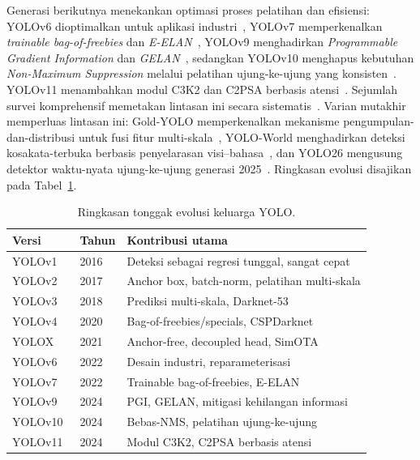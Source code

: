 \documentclass[11pt,a4paper]{article}
\begin{document}
Generasi berikutnya menekankan optimasi proses pelatihan dan efisiensi:
YOLOv6 dioptimalkan untuk aplikasi industri~\cite{li2022yolov6}, YOLOv7
memperkenalkan \emph{trainable bag-of-freebies} dan \emph{E-ELAN}~\cite{wang2023yolov7},
YOLOv9 menghadirkan \emph{Programmable Gradient Information} dan
\emph{GELAN}~\cite{wang2024yolov9}, sedangkan YOLOv10 menghapus kebutuhan
\emph{Non-Maximum Suppression} melalui pelatihan ujung-ke-ujung yang
konsisten~\cite{wang2024yolov10}. YOLOv11 menambahkan modul C3K2 dan C2PSA
berbasis atensi~\cite{khanam2024yolov11}. Sejumlah survei komprehensif memetakan
lintasan ini secara sistematis~\cite{terven2023yolo,hussain2023yolo,diwan2023yolo,
sapkota2024yoloagri,ali2024yoloreview,vijayakumar2024yolo,alif2024yoloevolution,
sohan2024yolov8review}. Varian mutakhir memperluas lintasan ini: Gold-YOLO
memperkenalkan mekanisme pengumpulan-dan-distribusi untuk fusi fitur
multi-skala~\cite{wang2023goldyolo}, YOLO-World menghadirkan deteksi
kosakata-terbuka berbasis penyelarasan visi--bahasa~\cite{cheng2024yoloworld},
dan YOLO26 mengusung detektor waktu-nyata ujung-ke-ujung generasi
2025~\cite{sapkota2025yolo26}. Ringkasan evolusi disajikan pada Tabel~\ref{tab:yolo}.

\begin{table}[htbp]
\centering
\caption{Ringkasan tonggak evolusi keluarga YOLO.}
\label{tab:yolo}
\small
\begin{tabular}{@{}llp{7.6cm}@{}}
\toprule
\textbf{Versi} & \textbf{Tahun} & \textbf{Kontribusi utama} \\
\midrule
YOLOv1~\cite{redmon2016yolo}      & 2016 & Deteksi sebagai regresi tunggal, sangat cepat \\
YOLOv2~\cite{redmon2017yolo9000}  & 2017 & Anchor box, batch-norm, pelatihan multi-skala \\
YOLOv3~\cite{redmon2018yolov3}    & 2018 & Prediksi multi-skala, Darknet-53 \\
YOLOv4~\cite{bochkovskiy2020yolov4} & 2020 & Bag-of-freebies/specials, CSPDarknet \\
YOLOX~\cite{ge2021yolox}          & 2021 & Anchor-free, decoupled head, SimOTA \\
YOLOv6~\cite{li2022yolov6}        & 2022 & Desain industri, reparameterisasi \\
YOLOv7~\cite{wang2023yolov7}      & 2022 & Trainable bag-of-freebies, E-ELAN \\
YOLOv9~\cite{wang2024yolov9}      & 2024 & PGI, GELAN, mitigasi kehilangan informasi \\
YOLOv10~\cite{wang2024yolov10}    & 2024 & Bebas-NMS, pelatihan ujung-ke-ujung \\
YOLOv11~\cite{khanam2024yolov11}  & 2024 & Modul C3K2, C2PSA berbasis atensi \\
\bottomrule
\end{tabular}
\end{table}
\end{document}
